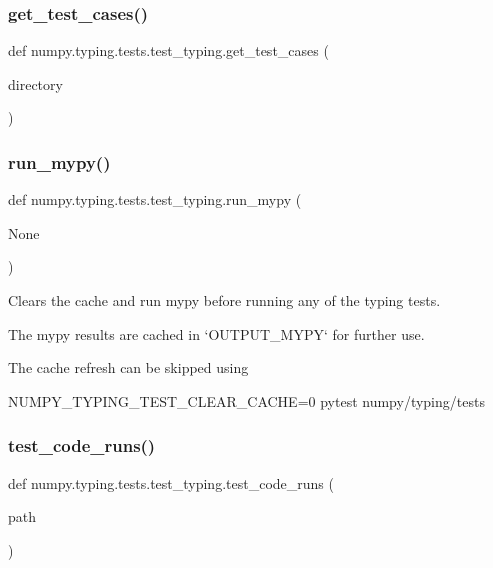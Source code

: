\subsubsection{\texorpdfstring{get\+\_\+test\+\_\+cases()}{get\_test\_cases()}}
{\footnotesize\ttfamily def numpy.\+typing.\+tests.\+test\+\_\+typing.\+get\+\_\+test\+\_\+cases (\begin{DoxyParamCaption}\item[{}]{directory }\end{DoxyParamCaption})}

\mbox{\label{namespacenumpy_1_1typing_1_1tests_1_1test__typing_a822dc4c17a7831f04962a1247ca8689f}} 
\subsubsection{\texorpdfstring{run\+\_\+mypy()}{run\_mypy()}}
{\footnotesize\ttfamily def numpy.\+typing.\+tests.\+test\+\_\+typing.\+run\+\_\+mypy (\begin{DoxyParamCaption}\item[{}]{None }\end{DoxyParamCaption})}

\begin{DoxyVerb}Clears the cache and run mypy before running any of the typing tests.

The mypy results are cached in `OUTPUT_MYPY` for further use.

The cache refresh can be skipped using

NUMPY_TYPING_TEST_CLEAR_CACHE=0 pytest numpy/typing/tests
\end{DoxyVerb}
 \mbox{\label{namespacenumpy_1_1typing_1_1tests_1_1test__typing_a7c833b024d921886cd5dd72e9bda3074}} 
\subsubsection{\texorpdfstring{test\+\_\+code\+\_\+runs()}{test\_code\_runs()}}
{\footnotesize\ttfamily def numpy.\+typing.\+tests.\+test\+\_\+typing.\+test\+\_\+code\+\_\+runs (\begin{DoxyParamCaption}\item[{}]{path }\end{DoxyParamCaption})}

